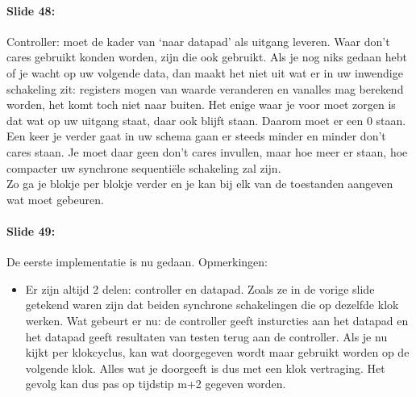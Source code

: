 \documentclass[10pt,a4paper]{book}
\begin{document}
\paragraph{Slide 48:} Controller: moet de kader van `naar datapad' als uitgang leveren. Waar don't cares gebruikt konden worden, zijn die ook gebruikt. Als je nog niks gedaan hebt of je wacht op uw volgende data, dan maakt het niet uit wat er in uw inwendige schakeling zit: registers mogen van waarde veranderen en vanalles mag berekend worden, het komt toch niet naar buiten. Het enige waar je voor moet zorgen is dat wat op uw uitgang staat, daar ook blijft staan. Daarom moet er een 0 staan. Een keer je verder gaat in uw schema gaan er steeds minder en minder don't cares staan. Je moet daar geen don't cares invullen, maar hoe meer er staan, hoe compacter uw synchrone sequenti\"ele schakeling zal zijn.\\
Zo ga je blokje per blokje verder en je kan bij elk van de toestanden aangeven wat moet gebeuren. 

\paragraph{Slide 49:} De eerste implementatie is nu gedaan. Opmerkingen: 
\begin{itemize}
\item Er zijn altijd 2 delen: controller en datapad. Zoals ze in de vorige slide getekend waren zijn dat beiden synchrone schakelingen die op dezelfde klok werken. Wat gebeurt er nu: de controller geeft insturcties aan het datapad en het datapad geeft resultaten van testen terug aan de controller. Als je nu kijkt per klokcyclus, kan wat doorgegeven wordt maar gebruikt worden op de volgende klok. Alles wat je doorgeeft is dus met een klok vertraging. Het gevolg kan dus pas op tijdstip m+2 gegeven worden.
\end{itemize}
\end{document}
